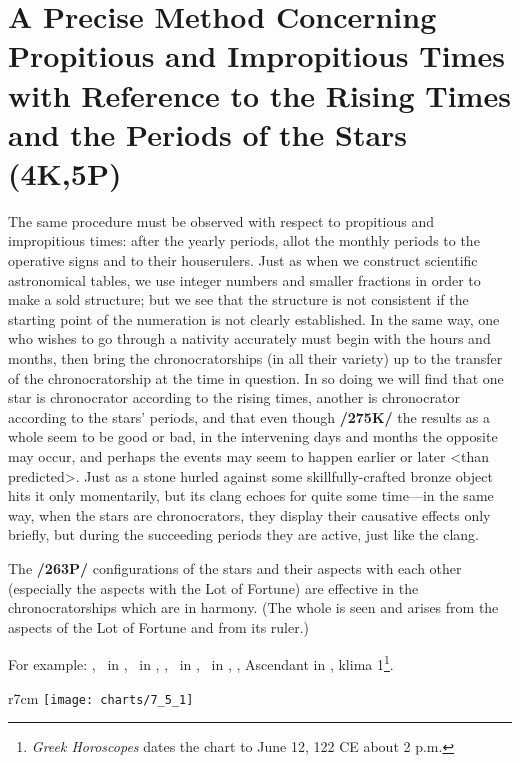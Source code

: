 \section{A Precise Method Concerning Propitious and Impropitious Times with Reference to the Rising Times and the Periods of the Stars (4K,5P)}

The same procedure must be observed with respect to propitious and impropitious times: after the yearly periods, allot the monthly periods to the operative signs and to their houserulers. Just as when we construct scientific astronomical tables, we use integer numbers and smaller fractions in order to make a sold structure; but we see that the structure is not consistent if the starting point of the numeration is not
clearly established. In the same way, one who wishes to go through a nativity accurately must begin with the hours and months, then bring the chronocratorships (in all their variety) up to the transfer of the
chronocratorship at the time in question. In so doing we will find that one star is chronocrator according to the rising times, another is chronocrator according to the stars’ periods, and that even though \textbf{/275K/} the results as a whole seem to be good or bad, in the intervening days and months the opposite may occur, and perhaps the events may seem to happen earlier or later <than predicted>. Just as a stone hurled against some skillfully-crafted bronze object hits it only momentarily, but its clang echoes for quite some time—in the same way, when the stars are chronocrators, they display their causative effects only briefly, but during the succeeding periods they are active, just like the clang. 

The \textbf{/263P/} configurations of the stars and their aspects with each other (especially the aspects with the Lot of Fortune) are effective in the chronocratorships which are in harmony. (The whole is seen and arises from the aspects of the Lot of Fortune and from its ruler.)

\newpage
For example: \Sun, \Mercury\, in \Gemini, \Moon\, in \Aquarius, \Saturn, \Venus\, in \Leo, \Jupiter\, in
\Sagittarius, \Mars, Ascendant in \Libra, klima 1\footnote{\textit{Greek Horoscopes} dates the chart to June 12, 122 CE about 2 p.m.}. 

\begin{wrapfigure}[15]{r}{7cm}
\centering
\vspace{-1em}
\texttt{[image: charts/7\_5\_1]}
\caption{Chart 81 [VII.5.1, GH L122, VI.12]}
\label{fig:chart81}
\end{wrapfigure} 

